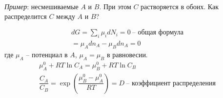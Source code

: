 \begin{lecture}
\begin{lecSection}
		\textit{Пример}: несмешиваемые $ A $ и $ B $. При этом $ C $ растворяется в обоих. Как распределится $ C $ между $ A $ и $ B $?
		
		\begin{gather*}
			d G = \sum\limits_i \mu_i dN_i = 0 ~\text{-- общая формула} \\
			= \mu_A dn_A - \mu_B dn_A = 0
		\end{gather*}
		где $ \mu_A $ -- потенциал в $ A $, $ \mu_A = \mu_B $ в равновесии.
		\begin{gather*}
		\mu_A^0 + RT \ln C_A = \mu_B^0 + RT \ln C_B \\
		\dfrac{C_A}{C_B} = \exp \left( \dfrac{\mu_B^0 - \mu_A^0}{RT}\right) = D~\text{-- коэффициент распределения}
		\end{gather*}
	\end{lecSection}
\end{lecture}